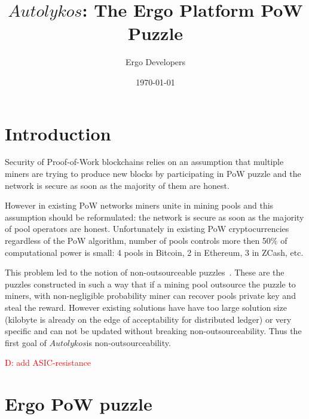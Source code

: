\documentclass[]{article}
\newcommand{\dnote}[1]{\textcolor{red}{D: {#1}}}
\newcommand{\Name}{$Autolykos$}
\begin{document}
    \title{\Name: The Ergo Platform PoW Puzzle}

    \author{Ergo Developers}

    \date{\today}
    \maketitle



    \section{Introduction}

    Security of Proof-of-Work blockchains relies on an assumption
    that multiple miners are trying to produce new blocks by
    participating in PoW puzzle and the network is secure as soon as the
    majority of them are honest.

    However in existing PoW networks miners unite in mining pools and
    this assumption should be reformulated: the network is secure as soon as the
    majority of pool operators are honest.
    Unfortunately in existing PoW cryptocurrencies
    regardless of the PoW algorithm, number of pools controls more then 50\% of
    computational power is small: 4 pools in Bitcoin, 2 in Ethereum, 3 in ZCash, etc.

    This problem led to the notion of non-outsourceable puzzles~\cite{miller2015nonoutsourceable,daian2017piecework}.
    These are the puzzles constructed in such a way that if a mining pool outsource the puzzle
    to miners, with non-negligible probability miner can recover pools private key and steal the reward.
    However existing solutions have have too large solution size (kilobyte is already
    on the edge of acceptability for distributed ledger) or very specific and
    can not be updated without breaking non-outsourceability. Thus the first goal of \Name is non-outsourceability.

    \dnote{add ASIC-resistance}

    \section{Ergo PoW puzzle}
\end{document}
